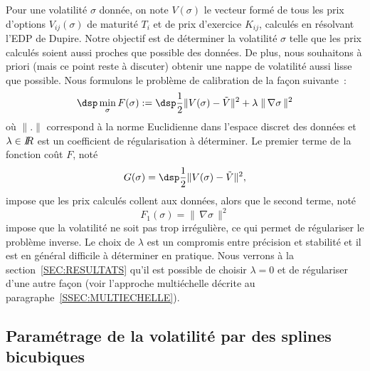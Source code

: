 Pour une volatilit\'e $\sigma$ donn\'ee, on note $V(\sigma)$ le 
vecteur form\'e de tous les prix d'options $V_{ij}(\sigma)$ de 
maturit\'e $T_i$ et de prix d'exercice $K_{ij}$, calcul\'es en 
r\'esolvant l'EDP de Dupire. Notre objectif est de d\'eterminer 
la volatilit\'e $\sigma$ telle que les prix calcul\'es soient 
aussi proches que possible des donn\'ees. De plus, nous 
souhaitons \`a priori (mais ce point reste \`a discuter) obtenir 
une nappe de volatilit\'e aussi lisse que possible. Nous 
formulons le probl\`eme de calibration de la fa\c con suivante~: 
\begin{equation}
\label{FORM:MIN}
\dsp\min_{\sigma} F(\sigma) := \dsp\frac{1}{2} 
\| V(\sigma) - \tilde{V} \|^2 + 
\lambda \; \| \, \nabla \sigma \, \|^2
\end{equation}
o\`u $\|.\|$ correspond \`a la norme Euclidienne dans l'espace 
discret des donn\'ees et $\lambda \in I\!\! R$ est un coefficient 
de r\'egularisation \`a d\'eterminer. Le premier terme de la 
fonction co\^ut $F$, not\'e 
$$
G(\sigma) = \dsp\frac{1}{2} \| V(\sigma) - \tilde{V} \|^2, 
$$
impose que les prix calcul\'es collent aux donn\'ees, alors que 
le second terme, not\'e 
$$
F_1(\sigma) = \| \, \nabla \sigma \, \|^2
$$
impose que la volatilit\'e ne soit pas trop irr\'eguli\`ere, ce 
qui permet de r\'egulariser le probl\`eme inverse. Le choix 
de $\lambda$ est un compromis entre pr\'ecision et stabilit\'e 
et il est en g\'en\'eral difficile \`a d\'eterminer en pratique. 
Nous verrons \`a la section~\ref{SEC:RESULTATS} qu'il est possible 
de choisir $\lambda = 0$ et de r\'egulariser d'une autre fa\c con 
(voir l'approche multi\'echelle d\'ecrite au 
paragraphe~\ref{SSEC:MULTIECHELLE}).

\subsection{Param\'etrage de la volatilit\'e par des splines 
bicubiques}

